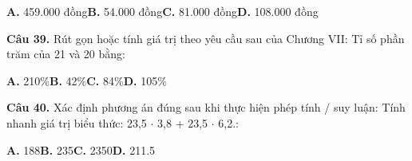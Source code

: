 \documentclass[11pt,a4paper]{article}
\begin{document}
\hspace*{1.5em}\textbf{A.} 459.000 đồng\quad\quad \textbf{B.} 54.000 đồng\quad\quad \textbf{C.} 81.000 đồng\quad\quad \textbf{D.} 108.000 đồng\par\vspace{2pt}
\textbf{\color{primary} Câu 39.} Rút gọn hoặc tính giá trị theo yêu cầu sau của Chương VII: Tỉ số phần trăm của 21 và 20 bằng:\par
\hspace*{1.5em}\textbf{A.} 210\%\quad\quad \textbf{B.} 42\%\quad\quad \textbf{C.} 84\%\quad\quad \textbf{D.} 105\%\par\vspace{2pt}
\textbf{\color{primary} Câu 40.} Xác định phương án đúng sau khi thực hiện phép tính / suy luận: Tính nhanh giá trị biểu thức: 23,5 $\cdot$ 3,8 + 23,5 $\cdot$ 6,2.:\par
\hspace*{1.5em}\textbf{A.} 188\quad\quad \textbf{B.} 235\quad\quad \textbf{C.} 2350\quad\quad \textbf{D.} 211.5\par\vspace{2pt}
\end{document}
